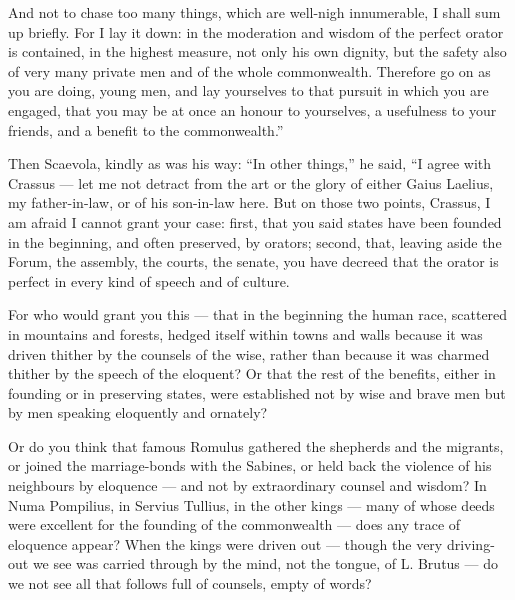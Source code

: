  And not to chase too many things, which are well-nigh innumerable, I shall sum up briefly. For I lay it down: in the moderation and wisdom of the perfect orator is contained, in the highest measure, not only his own dignity, but the safety also of very many private men and of the whole commonwealth. Therefore go on as you are doing, young men, and lay yourselves to that pursuit in which you are engaged, that you may be at once an honour to yourselves, a usefulness to your friends, and a benefit to the commonwealth.''

 Then Scaevola, kindly as was his way: ``In other things,'' he said, ``I agree with Crassus — let me not detract from the art or the glory of either Gaius Laelius, my father-in-law, or of his son-in-law here. But on those two points, Crassus, I am afraid I cannot grant your case: first, that you said states have been founded in the beginning, and often preserved, by orators; second, that, leaving aside the Forum, the assembly, the courts, the senate, you have decreed that the orator is perfect in every kind of speech and of culture.

 For who would grant you this — that in the beginning the human race, scattered in mountains and forests, hedged itself within towns and walls because it was driven thither by the counsels of the wise, rather than because it was charmed thither by the speech of the eloquent? Or that the rest of the benefits, either in founding or in preserving states, were established not by wise and brave men but by men speaking eloquently and ornately?

 Or do you think that famous Romulus gathered the shepherds and the migrants, or joined the marriage-bonds with the Sabines, or held back the violence of his neighbours by eloquence — and not by extraordinary counsel and wisdom? In Numa Pompilius, in Servius Tullius, in the other kings — many of whose deeds were excellent for the founding of the commonwealth — does any trace of eloquence appear? When the kings were driven out — though the very driving-out we see was carried through by the mind, not the tongue, of L. Brutus — do we not see all that follows full of counsels, empty of words?

